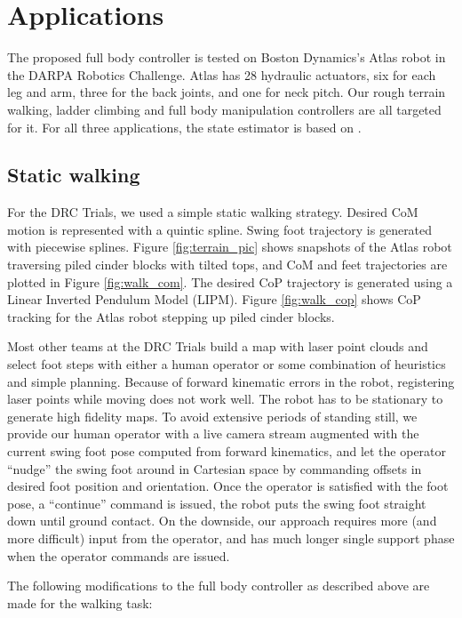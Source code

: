 \documentclass{ws-ijhr}
\newcommand{\fref}[1] {Figure \ref{#1}}
\begin{document}
\section{Applications}
The proposed full body controller is tested on Boston Dynamics's Atlas robot in 
the DARPA Robotics Challenge. Atlas has 28 hydraulic actuators, six for each leg 
and arm, three for the back joints, and one for neck pitch. Our rough terrain walking, 
ladder climbing and full body manipulation controllers are all targeted for it. 
For all three applications, the state estimator is based on \cite{xinji}.

\subsection{Static walking}
\label{sec:static_walking}
For the DRC Trials, we used a simple static walking strategy. 
Desired CoM motion is represented with a quintic spline. Swing foot trajectory 
is generated with piecewise splines. 
\fref{fig:terrain_pic} shows snapshots of the Atlas robot traversing piled cinder
blocks with tilted tops, and CoM and feet trajectories are plotted in 
\fref{fig:walk_com}. 
The desired CoP trajectory is 
generated using a Linear Inverted Pendulum Model (LIPM). \fref{fig:walk_cop} shows 
CoP tracking for the Atlas robot stepping up piled cinder blocks. 

Most other teams at the DRC Trials
build a map with laser point clouds and select foot steps with either a human 
operator or some combination of heuristics and simple planning. Because of 
forward kinematic errors in the robot, registering laser points while moving
does not work well. The robot has to be stationary to generate high fidelity 
maps. To avoid extensive periods of standing still, we provide our
human operator with a live camera stream augmented with the current swing 
foot pose computed from forward kinematics, and let the operator ``nudge'' 
the swing foot around in Cartesian space by commanding offsets in desired foot 
position and orientation. Once the operator is satisfied with the foot pose, 
a ``continue'' command is issued, the robot puts the swing foot 
straight down until ground contact. On the downside, our approach requires
more (and more difficult) input from the operator, and has much longer single
support phase when the operator commands are issued.

The following modifications to the full body controller as described above are
made for the walking task:
\end{document}
